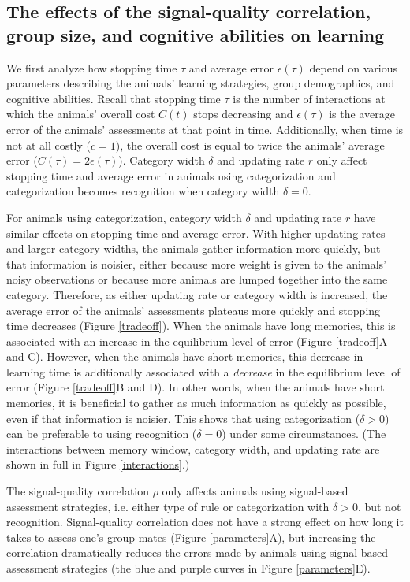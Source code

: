 \subsection*{The effects of the signal-quality correlation, group size, and cognitive abilities on learning}
We first analyze how stopping time $\tau$  and average error $\epsilon(\tau)$ depend on various parameters describing the animals' learning strategies, group demographics, and cognitive abilities. Recall that stopping time $\tau$ is the number of interactions at which the animals' overall cost $C(t)$ stops decreasing and $\epsilon(\tau)$ is the average error of the animals' assessments at that point in time. Additionally, when time is not at all costly ($c=1$), the overall cost is equal to twice the animals' average error ($C(\tau)=2\epsilon(\tau)$). Category width $\delta$ and updating rate $r$ only affect stopping time and average error in animals using categorization and categorization becomes recognition when category width $\delta=0$.

For animals using categorization, category width $\delta$ and updating rate $r$ have similar effects on stopping time and average error. With higher updating rates and larger category widths, the animals gather information more quickly, but that information is noisier, either because more weight is given to the animals' noisy observations or because more animals are lumped together into the same category. Therefore, as either updating rate or category width is increased, the average error of the animals' assessments plateaus more quickly and stopping time decreases (Figure \ref{tradeoff}). When the animals have long memories, this is associated with an increase in the equilibrium level of error (Figure \ref{tradeoff}A and C). However, when the animals have short memories, this decrease in learning time is additionally associated with a \emph{decrease} in the equilibrium level of error (Figure \ref{tradeoff}B and D). In other words, when the animals have short memories, it is beneficial to gather as much information as quickly as possible, even if that information is noisier. This shows that using categorization ($\delta>0$) can be preferable to using recognition ($\delta=0$) under some circumstances. (The interactions between memory window, category width, and updating rate are shown in full in Figure \ref{interactions}.)

The signal-quality correlation $\rho$ only affects animals using signal-based assessment strategies, i.e. either type of rule or categorization with $\delta>0$, but not recognition. Signal-quality correlation does not have a strong effect on how long it takes to assess one's group mates (Figure \ref{parameters}A), but increasing the correlation dramatically reduces the errors made by animals using signal-based assessment strategies (the blue and purple curves in Figure \ref{parameters}E).

